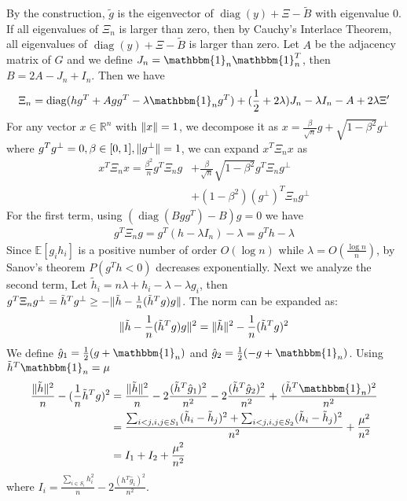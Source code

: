 \documentclass{article}
\DeclarePairedDelimiter\norm{\lVert}{\rVert}
\DeclareMathOperator{\diag}{diag}
\begin{document}
By the construction, $\tilde{g}$ is the eigenvector of $\diag(y) + \Xi - \widetilde{B}$ with eigenvalue $0$.
If all eigenvalues of $\Xi_n$ is larger than zero, then by
Cauchy's Interlace Theorem, all eigenvalues of $\diag(y) + \Xi- \tilde{B}$ is larger than zero.
Let $A$ be the adjacency matrix of $G$
and we define $J_n = \mathbbm{1}_n \mathbbm{1}_n^T $, then $B=2A-J_n+I_n$.
Then we have
\begin{equation}\label{eq:Xi_n}
\Xi_n = \diag(hg^T + Agg^T -\lambda \mathbbm{1}_ng^T)  + (\frac{1}{2} +2\lambda) J_n -\lambda I_n - A + 2\lambda \Xi'
\end{equation}
For any vector $x \in \mathbb{R}^n$ with $\norm{x}=1$, we decompose it as $x=\frac{\beta}{\sqrt{n}} g
+ \sqrt{1-\beta^2} g^{\perp}$ where $g^Tg^{\perp}=0, \beta \in [0,1], \norm{g^{\perp}}=1$, we can expand $x^T \Xi_n x$ as
\begin{align*}
x^T \Xi_n x = \frac{\beta^2}{n} g^T \Xi_n g  &
+		\frac{\beta}{\sqrt{n}}\sqrt{1-\beta^2} g^T \Xi_n g^{\perp}
\\
&+
(1-\beta^2)(g^{\perp})^T \Xi_n g^{\perp} 
\end{align*}
For the first term, using $(\diag(Bgg^T) - B)g=0$ we have
\begin{align*}
g^T \Xi_n g = g^T(h -\lambda I_n) -\lambda  = g^T h-\lambda
\end{align*}
Since $\mathbb{E}[g_ih_i]$ is a positive number of order $O(\log n)$ while $\lambda=O(\frac{\log n}{n})$,
by Sanov's theorem
$P(g^T h < 0)$ decreases exponentially. Next we analyze the second term, Let $\tilde{h}_i
=n\lambda+h_i-\lambda-\lambda g_i$, then
$g^T \Xi_n g^{\perp} = \tilde{h}^T g^{\perp} \geq -\norm{\tilde{h}-\frac{1}{n}(\tilde{h}^Tg)g}$.
The norm can be expanded as:
\begin{align*}
\norm{\tilde{h}-\frac{1}{n}(\tilde{h}^Tg)g}^2
=\norm{\tilde{h}}^2 - \frac{1}{n}(\tilde{h}^Tg)^2
\end{align*}
We define $\hat{g}_1 = \frac{1}{2}(g + \mathbbm{1}_n)$ and $\hat{g}_2 = \frac{1}{2}(-g +\mathbbm{1}_n)$.
Using $\tilde{h}^T\mathbbm{1}_n=\mu$ 
\begin{align*}
\frac{\norm{\tilde{h}}^2}{n} - (\frac{1}{n}\tilde{h}^Tg)^2
&=\frac{\norm{\tilde{h}}^2}{n} - 2\frac{(\tilde{h}^T \hat{g}_1)^2}{n^2} - 2\frac{(\tilde{h}^T \hat{g}_2)^2}{n^2} + \frac{(\tilde{h}^T\mathbbm{1}_n)^2}{n^2} \\
&=\frac{ \sum_{i<j,i,j\in S_1} (\tilde{h}_i - \tilde{h}_j)^2 + \sum_{i<j,i,j\in S_2} (\tilde{h}_i - \tilde{h}_j)^2 }{n^2}+ \frac{\mu^2}{n^2}\\
& = I_1 + I_2 + \frac{\mu^2}{n^2}
\end{align*}
where $I_i=\frac{\sum_{i\in S_i} h_i^2}{n} - 2\frac{(h^T \hat{g}_i)^2}{n^2}$.
\end{document}
